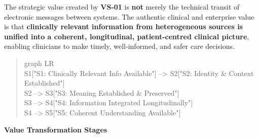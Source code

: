 The strategic value created by \textbf{VS-01} is \textbf{not} merely the technical transit of electronic messages between systems. The authentic clinical and enterprise value is that \textbf{clinically relevant information from heterogeneous sources is unified into a coherent, longitudinal, patient-centred clinical picture}, enabling clinicians to make timely, well-informed, and safer care decisions.



\begin{quote}\small\ttfamily
graph LR\\
    S1["S1: Clinically Relevant Info Available"] --> S2["S2: Identity \& Context Established"]\\
    S2 --> S3["S3: Meaning Established \& Preserved"]\\
    S3 --> S4["S4: Information Integrated Longitudinally"]\\
    S4 --> S5["S5: Coherent Understanding Available"]\\

\end{quote}


\par\medskip\textbf{Value Transformation Stages}\par


